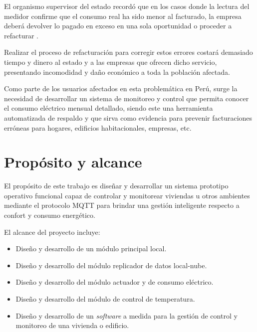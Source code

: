 El organismo supervisor del estado recordó que en los casos donde la lectura del medidor confirme que el consumo real ha sido menor al facturado, la empresa deberá devolver lo pagado en exceso en una sola oportunidad o proceder a refacturar \citep{WEBSITE:2}.

Realizar el proceso de refacturación para corregir estos errores costará demasiado tiempo y dinero al estado y a las empresas que ofrecen dicho servicio, presentando incomodidad y daño económico a toda la población afectada. 

Como parte de los usuarios afectados en esta problemática en Perú, surge la necesidad de desarrollar un sistema de monitoreo y control que permita conocer el consumo eléctrico mensual detallado, siendo este una herramienta automatizada de respaldo y que sirva como evidencia para prevenir facturaciones erróneas para hogares, edificios habitacionales, empresas, etc.




\section{Propósito y alcance}




El propósito de este trabajo es diseñar y desarrollar un sistema prototipo operativo funcional capaz de controlar y monitorear viviendas u otros ambientes mediante el protocolo MQTT para brindar una gestión inteligente respecto a confort y consumo energético.


El alcance del proyecto incluye:
\begin{itemize}
\item Diseño y desarrollo de un módulo principal local.
\item Diseño y desarrollo del módulo replicador de datos local-nube.
\item Diseño y desarrollo del módulo actuador y de consumo eléctrico.
\item Diseño y desarrollo del módulo de control de temperatura.
\item Diseño y desarrollo de un \emph{software} a medida para la gestión de control y monitoreo de una vivienda o edificio.
\end{itemize}

